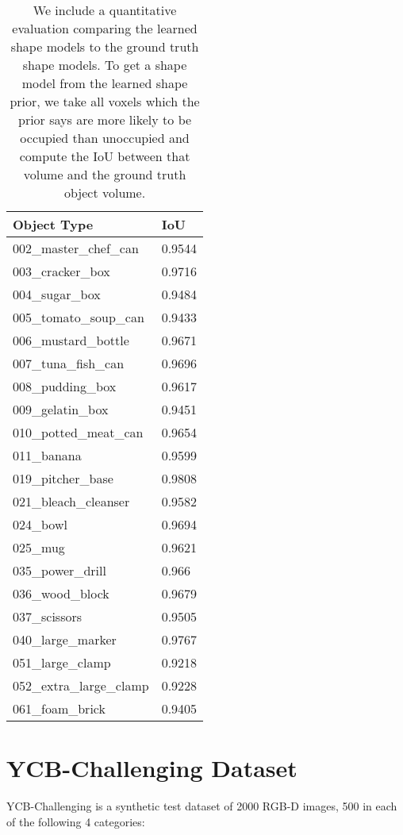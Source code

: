 \begin{table}[H]
	\fontsize{7.5pt}{7.5pt}\selectfont
	\setlength{\tabcolsep}{3pt}
	\centering
	\centering
	\begin{tabular}{|l|l|}
		\toprule
Object Type&IoU\\
\midrule
002\_master\_chef\_can & 0.9544  \\
003\_cracker\_box & 0.9716  \\
004\_sugar\_box & 0.9484  \\
005\_tomato\_soup\_can & 0.9433 \\
006\_mustard\_bottle & 0.9671 \\
007\_tuna\_fish\_can & 0.9696 \\
008\_pudding\_box & 0.9617 \\
009\_gelatin\_box & 0.9451 \\
010\_potted\_meat\_can & 0.9654  \\
011\_banana & 0.9599 \\
019\_pitcher\_base & 0.9808 \\
021\_bleach\_cleanser & 0.9582 \\
024\_bowl & 0.9694 \\
025\_mug & 0.9621 \\
035\_power\_drill & 0.966 \\
036\_wood\_block & 0.9679 \\
037\_scissors & 0.9505 \\
040\_large\_marker & 0.9767 \\
051\_large\_clamp & 0.9218 \\
052\_extra\_large\_clamp & 0.9228 \\
061\_foam\_brick & 0.9405 \\
\bottomrule
	\end{tabular}
	\caption{We include a quantitative evaluation comparing the learned shape models to the ground truth shape models. To get a shape model from the learned shape prior, we take all voxels which the prior says are more likely to be occupied than unoccupied and compute the IoU between that volume and the ground truth object volume.}
\end{table}


\section{YCB-Challenging Dataset}

YCB-Challenging is a synthetic test dataset of 2000 RGB-D images, 500 in each of the following 4 categories:


